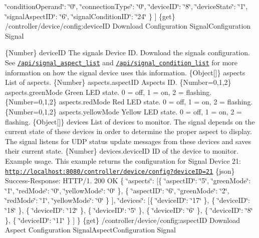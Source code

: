 \char`\"{}condition\+Operand\char`\"{}\+: \char`\"{}0\char`\"{}, \char`\"{}connection\+Type\char`\"{}\+: \char`\"{}0\char`\"{}, \char`\"{}device\+I\+D\char`\"{}\+: \char`\"{}8\char`\"{}, \char`\"{}device\+State\char`\"{}\+: \char`\"{}1\char`\"{}, \char`\"{}signal\+Aspect\+I\+D\char`\"{}\+: \char`\"{}6\char`\"{}, \char`\"{}signal\+Condition\+I\+D\char`\"{}\+: \char`\"{}24\char`\"{} \} \mbox{]}  \{get\} /controller/device/config\+:device\+ID Download Configuration  Signal\+Configuration  Signal

\{Number\} device\+ID The signal\textquotesingle{}s Device ID.  Download the signal\textquotesingle{}s configuration. See \href{#api-Signal-SignalAspectList}{\tt /api/signal\+\_\+aspect\+\_\+list} and \href{#api-Signal-SignalAspectConditionList}{\tt /api/signal\+\_\+condition\+\_\+list} for more information on how the signal device uses this information.  \{Object\mbox{[}\mbox{]}\} aspects List of aspects.  \{Number\} aspects.\+aspect\+ID Aspect\textquotesingle{}s ID.  \{Number=0,1,2\} aspects.\+green\+Mode Green L\+ED state. 0 = off, 1 = on, 2 = flashing.  \{Number=0,1,2\} aspects.\+red\+Mode Red L\+ED state. 0 = off, 1 = on, 2 = flashing.  \{Number=0,1,2\} aspects.\+yellow\+Mode Yellow L\+ED state. 0 = off, 1 = on, 2 = flashing.  \{Object\mbox{[}\mbox{]}\} devices List of devices to monitor. The signal depends on the current state of these devices in order to determine the proper aspect to display. The signal listens for U\+DP status update messages from these devices and saves their current state.  \{Number\} devices.\+device\+ID ID of the device to monitor.  Example usage. This example returns the configuration for Signal Device 21\+: \href{http://localhost:8080/controller/device/config?deviceID=21}{\tt http\+://localhost\+:8080/controller/device/config?device\+I\+D=21}  \{json\} Success-\/\+Response\+: H\+T\+T\+P/1. 200 OK \{ \char`\"{}aspects\char`\"{}\+: \mbox{[}\{ \char`\"{}aspect\+I\+D\char`\"{}\+: \char`\"{}5\char`\"{}, \char`\"{}green\+Mode\char`\"{}\+: \char`\"{}1\char`\"{}, \char`\"{}red\+Mode\char`\"{}\+: \char`\"{}0\char`\"{}, \char`\"{}yellow\+Mode\char`\"{}\+: \char`\"{}0\char`\"{} \}, \{ \char`\"{}aspect\+I\+D\char`\"{}\+: \char`\"{}6\char`\"{}, \char`\"{}green\+Mode\char`\"{}\+: \char`\"{}2\char`\"{}, \char`\"{}red\+Mode\char`\"{}\+: \char`\"{}1\char`\"{}, \char`\"{}yellow\+Mode\char`\"{}\+: \char`\"{}0\char`\"{} \} \mbox{]}, \char`\"{}devices\char`\"{}\+: \mbox{[}\{ \char`\"{}device\+I\+D\char`\"{}\+: \char`\"{}17\char`\"{} \}, \{ \char`\"{}device\+I\+D\char`\"{}\+: \char`\"{}18\char`\"{} \}, \{ \char`\"{}device\+I\+D\char`\"{}\+: \char`\"{}12\char`\"{} \}, \{ \char`\"{}device\+I\+D\char`\"{}\+: \char`\"{}5\char`\"{} \}, \{ \char`\"{}device\+I\+D\char`\"{}\+: \char`\"{}6\char`\"{} \}, \{ \char`\"{}device\+I\+D\char`\"{}\+: \char`\"{}8\char`\"{} \}, \{ \char`\"{}device\+I\+D\char`\"{}\+: \char`\"{}11\char`\"{} \} \mbox{]} \}  \{get\} /controller/device/config\+:aspect\+ID Download Aspect Configuration  Signal\+Aspect\+Configuration  Signal

